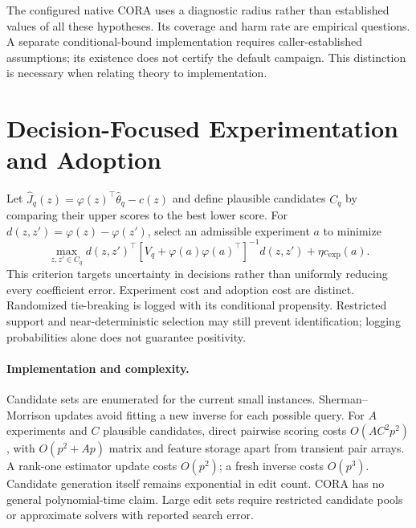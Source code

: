 \documentclass[runningheads]{llncs}
\begin{document}
The configured native CORA uses a diagnostic radius rather than established values of all these hypotheses. Its coverage and harm rate are empirical questions. A separate conditional-bound implementation requires caller-established assumptions; its existence does not certify the default campaign. This distinction is necessary when relating theory to implementation.

\section{Decision-Focused Experimentation and Adoption}\label{sec:algorithm}
Let $\hat J_q(z)=\varphi(z)^\top\hat\theta_q-c(z)$ and define plausible candidates $C_q$ by comparing their upper scores to the best lower score. For $d(z,z')=\varphi(z)-\varphi(z')$, select an admissible experiment $a$ to minimize
\begin{equation}\label{eq:design}
    \max_{z,z'\in C_q}d(z,z')^\top[V_q+\varphi(a)\varphi(a)^\top]^{-1}d(z,z')+\eta c_{\mathrm{exp}}(a).
\end{equation}
This criterion targets uncertainty in decisions rather than uniformly reducing every coefficient error. Experiment cost and adoption cost are distinct. Randomized tie-breaking is logged with its conditional propensity. Restricted support and near-deterministic selection may still prevent identification; logging probabilities alone does not guarantee positivity.

\paragraph{Implementation and complexity.}
Candidate sets are enumerated for the current small instances. Sherman--Morrison updates avoid fitting a new inverse for each possible query. For $A$ experiments and $C$ plausible candidates, direct pairwise scoring costs $O(AC^2p^2)$, with $O(p^2+Ap)$ matrix and feature storage apart from transient pair arrays. A rank-one estimator update costs $O(p^2)$; a fresh inverse costs $O(p^3)$. Candidate generation itself remains exponential in edit count. CORA has no general polynomial-time claim. Large edit sets require restricted candidate pools or approximate solvers with reported search error.
\end{document}
